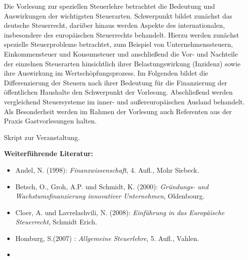 \begin{course}
\begin{content}
Die Vorlesung zur speziellen Steuerlehre betrachtet die Bedeutung und Auswirkungen der wichtigsten Steuerarten. Schwerpunkt bildet zunächst das deutsche Steuerrecht, darüber hinaus werden Aspekte des internationalen, insbesondere des europäischen Steuerrechts behandelt.\newline
Hierzu werden zunächst spezielle Steuerprobleme betrachtet, zum Beispiel von Unternehmenssteuern, Einkommensteuer und Konsumsteuer und anschließend die Vor- und Nachteile der einzelnen Steuerarten hinsichtlich ihrer Belastungswirkung (Inzidenz) sowie ihre Auswirkung im Wertschöpfungsprozess. Im Folgenden bildet die Differenzierung der Steuern nach ihrer Bedeutung für die Finanzierung der öffentlichen Haushalte den Schwerpunkt der Vorlesung. Abschließend werden vergleichend Steuersysteme im inner- und außereuropäischen Ausland behandelt. \newline
Als Besonderheit werden im Rahmen der Vorlesung auch Referenten aus der Praxis Gastvorlesungen halten.


\end{content}

\begin{media}Skript zur Veranstaltung.

\end{media}

\begin{literature}\textbf{Weiterführende Literatur:}

 \begin{itemize}\item  

Andel, N. (1998): \emph{Finanzwissenschaft}, 4. Aufl., Mohr Siebeck.

   \item  

Betsch, O., Groh, A.P. und Schmidt, K. (2000): \emph{Gründungs- und Wachstumsfinanzierung innovativer Unternehmen}, Oldenbourg.

   \item  

Cloer, A. und Lavrelashvili, N. (2008): \emph{Einführung in das Europäische Steuerrecht}, Schmidt Erich.

   \item  

Homburg, S.(2007) : \emph{Allgemeine Steuerlehre}, 5. Aufl., Vahlen.

   \item  


\end{itemize}
\end{literature}
\end{course}
